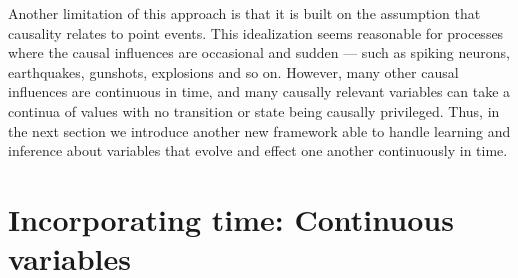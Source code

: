 \documentclass{cambridge7A}%
\newcommand{\ttodo}[2][]{\vspace{0.1cm} \hfil \todo[caption={\textbf{TG}}, size=\footnotesize, color = orange, inline, #1]{#2}}
\begin{document}
Another limitation of this approach is that it is built on the assumption that causality relates to point events.  This idealization seems reasonable for processes where the causal influences are occasional and sudden --- such as spiking neurons, earthquakes, gunshots, explosions and so on.  However, many other causal influences are continuous in time, and many causally relevant variables can take a continua of values with no transition or state being causally privileged.  Thus, in the next section we introduce another new framework able to handle learning and inference about variables that evolve and effect one another continuously in time.







\section{Incorporating time: Continuous variables}\label{section:ctcv}
\end{document}
